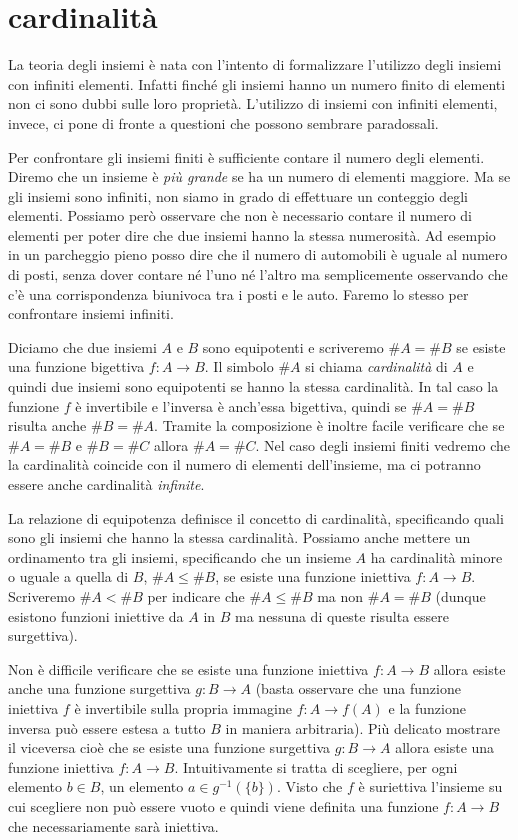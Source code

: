 \documentclass[italian,a4paper,hidelinks,headinclude]{scrartcl}
\newcommand{\myemph}[1]{\emph{#1}\marginpar{#1}}
\begin{document}
\section{cardinalità}

La teoria degli insiemi è nata con l'intento di formalizzare l'utilizzo degli
insiemi con infiniti elementi. Infatti finché gli insiemi hanno un numero finito
di elementi non ci sono dubbi sulle loro proprietà. L'utilizzo di insiemi con
infiniti elementi, invece, ci pone di fronte a questioni che possono sembrare
paradossali.

Per confrontare gli insiemi finiti è sufficiente contare il numero degli elementi.
Diremo che un insieme è \emph{più grande} se ha un numero di elementi maggiore.
Ma se gli insiemi sono infiniti, non siamo in grado di effettuare un conteggio
degli elementi. Possiamo però osservare che non è necessario contare il numero
di elementi per poter dire che due insiemi hanno la stessa numerosità.
Ad esempio in un parcheggio pieno posso dire che il numero di automobili
è uguale al numero di posti, senza dover contare né l'uno né l'altro ma semplicemente
osservando che c'è una corrispondenza biunivoca tra i posti e le auto. Faremo
lo stesso per confrontare insiemi infiniti.

Diciamo che due insiemi $A$ e $B$ sono equipotenti e scriveremo $\#A = \#B$
se esiste una funzione bigettiva $f\colon A \to B$.
Il simbolo $\#A$ si chiama \myemph{cardinalità} di $A$ e quindi due insiemi
sono equipotenti se hanno la stessa cardinalità.
In tal caso la funzione
$f$ è invertibile e l'inversa è anch'essa bigettiva,
quindi se $\#A = \#B$ risulta anche $\#B = \#A$.
Tramite la composizione è inoltre facile verificare che se $\#A = \#B$ e $\#B = \#C$
allora $\#A = \#C$.
Nel caso degli insiemi finiti vedremo che la cardinalità coincide con il
numero di elementi dell'insieme, ma ci potranno essere anche cardinalità
\emph{infinite}.

La relazione di equipotenza definisce il concetto di cardinalità, specificando
quali sono gli insiemi che hanno la stessa cardinalità. Possiamo anche mettere
un ordinamento tra gli insiemi, specificando che un insieme $A$ ha cardinalità
minore o uguale a quella di $B$, $\#A\le \#B$, se esiste una funzione
iniettiva $f\colon A \to B$. Scriveremo $\#A < \#B$ per indicare che
$\#A \le \#B$ ma non $\#A = \#B$ (dunque esistono funzioni iniettive da $A$ in $B$
ma nessuna di queste risulta essere surgettiva).

Non è difficile verificare che se esiste una funzione iniettiva $f\colon A\to B$
allora esiste anche una funzione surgettiva $g\colon B\to A$
(basta osservare che una funzione iniettiva $f$ è invertibile sulla propria
immagine $f\colon A \to f(A)$ e la funzione inversa può essere estesa a
tutto $B$ in maniera arbitraria).
Più delicato mostrare il viceversa cioè che se esiste una funzione surgettiva
$g\colon B \to A$ allora esiste una funzione iniettiva $f\colon A \to B$.
Intuitivamente si tratta di scegliere, per ogni elemento $b\in B$, un elemento
$a\in g^{-1}(\{b\})$. Visto che $f$ è suriettiva l'insieme su cui scegliere non
può essere vuoto e quindi viene definita una funzione $f\colon A \to B$ che
necessariamente sarà iniettiva.
\end{document}
